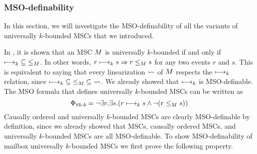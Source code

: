 \subsubsection{MSO-definability}

In this section, we will investigate the MSO-definability of all the variants of universally $k$-bounded MSCs that we introduced.

In \cite{DBLP:conf/fossacs/LohreyM02}, it is shown that an MSC $M$ is universally $k$-bounded if and only if $\longmapsto_k \;\subseteq\; \le_M$. In other words, $r \longmapsto_k s \Rightarrow r \le_M s$ for any two events $r$ and $s$. This is equivalent to saying that every linearization $\rightsquigarrow$ of $M$ respects the $\longmapsto_k$ relation, since $\longmapsto_k \;\subseteq\; \le_M \;\subseteq\; \rightsquigarrow$. We already showed that $\longmapsto_k$ is MSO-definable. The MSO formula that defines universally $k$-bounded  MSCs can be written as
\[ \Phi_{\forall k\text{-}b} = \neg \exists r.\exists s.(r \longmapsto_k s \wedge \neg(r \le_M s)) \]
Causally ordered and \pp universally $k$-bounded MSCs are clearly MSO-definable by definition, since we already showed that \pp MSCs, causally ordered MSCs, and universally $k$-bounded MSCs are all MSO-definable. To show MSO-definability of mailbox universally $k$-bounded MSCs we first prove the following property.

